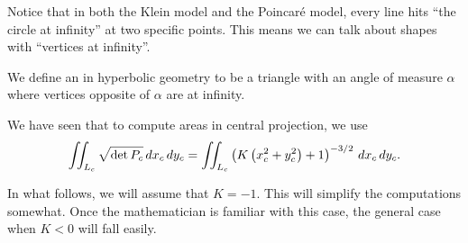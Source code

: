 \documentclass[newpage,hints,12pt,nooutcomes,noauthor,handout]{ximera}
\begin{document}
Notice that in both the Klein model and the Poincar\'e model, every line hits
``the circle at infinity'' at two specific points.  This means we can talk about
shapes with ``vertices at infinity''.

\begin{definition}
  We define an  in hyperbolic geometry to be a
  triangle with an angle of measure $\alpha$ where vertices opposite of $\alpha$
  are at infinity.
\end{definition}

We have seen that to compute areas in central projection, we use
\[
  \iint_{L_c} \sqrt{\det P_c}\,d x_c\,d y_c
  =\iint_{L_c} \left(K\left(x_c^2+y_c^2\right)+1\right)^{-3/2} \,d x_c\,d y_c.
\]


In what follows, we will assume that $K=-1$. This will simplify the
computations somewhat. Once the mathematician is familiar with this
case, the general case when $K<0$ will fall easily.
\end{document}
